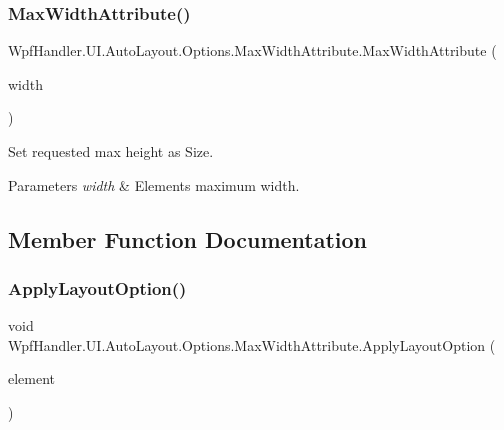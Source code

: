 \subsubsection{\texorpdfstring{Max\+Width\+Attribute()}{MaxWidthAttribute()}\hspace{0.1cm}{\footnotesize\ttfamily [2/2]}}
{\footnotesize\ttfamily Wpf\+Handler.\+U\+I.\+Auto\+Layout.\+Options.\+Max\+Width\+Attribute.\+Max\+Width\+Attribute (\begin{DoxyParamCaption}\item[{double}]{width }\end{DoxyParamCaption})}



Set requested max height as Size. 


\begin{DoxyParams}{Parameters}
{\em width} & Element\textquotesingle{}s maximum width.\\
\hline
\end{DoxyParams}


\subsection{Member Function Documentation}
\mbox{\label{class_wpf_handler_1_1_u_i_1_1_auto_layout_1_1_options_1_1_max_width_attribute_ab7c7bf52114b1aa465f70debaeccf5f4}} 
\subsubsection{\texorpdfstring{Apply\+Layout\+Option()}{ApplyLayoutOption()}}
{\footnotesize\ttfamily void Wpf\+Handler.\+U\+I.\+Auto\+Layout.\+Options.\+Max\+Width\+Attribute.\+Apply\+Layout\+Option (\begin{DoxyParamCaption}\item[{Framework\+Element}]{element }\end{DoxyParamCaption})}




